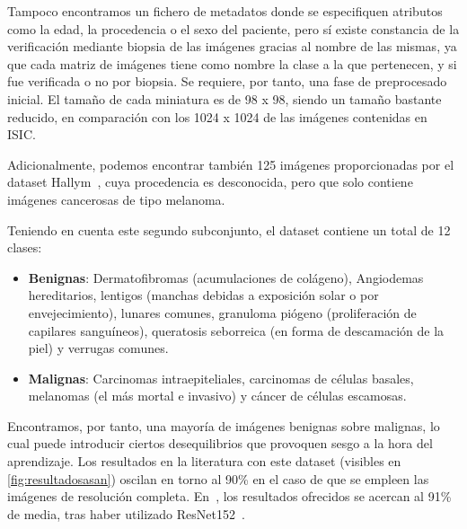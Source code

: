 Tampoco encontramos un fichero de metadatos donde se especifiquen atributos como la edad, la procedencia o el sexo del paciente, pero sí existe constancia de la verificación mediante biopsia de las imágenes gracias al nombre de las mismas, ya que cada matriz de imágenes tiene como nombre la clase a la que pertenecen, y si fue verificada o no por biopsia. Se requiere, por tanto, una fase de preprocesado inicial. El tamaño de cada miniatura es de 98 x 98, siendo un tamaño bastante reducido, en comparación con los 1024 x 1024 de las imágenes contenidas en ISIC.

Adicionalmente, podemos encontrar también 125 imágenes proporcionadas por el dataset Hallym~\cite{Han2017}, cuya procedencia es desconocida, pero que solo contiene imágenes cancerosas de tipo melanoma.

Teniendo en cuenta este segundo subconjunto, el dataset contiene un total de 12 clases:
\begin{itemize}
	\item \textbf{Benignas}: Dermatofibromas (acumulaciones de colágeno), Angiodemas hereditarios, lentigos (manchas debidas a exposición solar o por envejecimiento), lunares comunes, granuloma piógeno (proliferación de capilares sanguíneos), queratosis seborreica (en forma de descamación de la piel) y verrugas comunes.
	 \item \textbf{Malignas}: Carcinomas intraepiteliales, carcinomas de células basales, melanomas (el más mortal e invasivo) y cáncer de células escamosas.
\end{itemize}

Encontramos, por tanto, una mayoría de imágenes benignas sobre malignas, lo cual puede introducir ciertos desequilibrios que provoquen sesgo a la hora del aprendizaje. Los resultados en la literatura con este dataset (visibles en \ref{fig:resultadosasan}) oscilan en torno al 90\% en el caso de que se empleen las imágenes de resolución completa. En~\cite{HAN20189}, los resultados ofrecidos se acercan al 91\% de media, tras haber utilizado ResNet152~\cite{he2015deep}.


